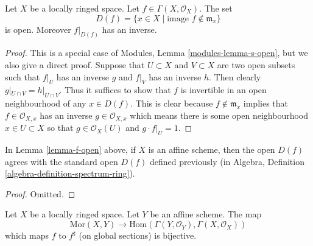 \begin{lemma}
\label{lemma-f-open}
Let $X$ be a locally ringed space.
Let $f \in \Gamma(X, \mathcal{O}_X)$.
The set
$$
D(f) = \{x \in X \mid \text{image }f \not\in \mathfrak m_x\}
$$
is open. Moreover $f|_{D(f)}$ has an inverse.
\end{lemma}

\begin{proof}
This is a special case of Modules, Lemma \ref{modules-lemma-s-open}, but
we also give a direct proof.
Suppose that $U \subset X$ and $V \subset X$ are
two open subsets such that $f|_U$ has an inverse
$g$ and $f|_V$ has an inverse $h$. Then clearly
$g|_{U\cap V} = h|_{U\cap V}$. Thus it suffices
to show that $f$ is invertible in an open neighbourhood
of any $x \in D(f)$. This is clear because
$f \not \in \mathfrak m_x$ implies that $f \in \mathcal{O}_{X, x}$
has an inverse $g \in \mathcal{O}_{X, x}$ which means there
is some open neighbourhood $x \in U \subset X$ so
that $g \in \mathcal{O}_X(U)$ and $g\cdot f|_U = 1$.
\end{proof}

\begin{lemma}
\label{lemma-f-open-affine}
In Lemma \ref{lemma-f-open} above, if $X$ is an affine scheme,
then the open $D(f)$ agrees with the standard open $D(f)$
defined previously (in
Algebra, Definition \ref{algebra-definition-spectrum-ring}).
\end{lemma}

\begin{proof}
Omitted.
\end{proof}

\begin{lemma}
\label{lemma-morphism-into-affine}
Let $X$ be a locally ringed space.
Let $Y$ be an affine scheme.
The map
$$
\text{Mor}(X, Y)
\longrightarrow
\text{Hom}(\Gamma(Y, \mathcal{O}_Y), \Gamma(X, \mathcal{O}_X))
$$
which maps $f$ to $f^\sharp$ (on global sections) is bijective.
\end{lemma}

